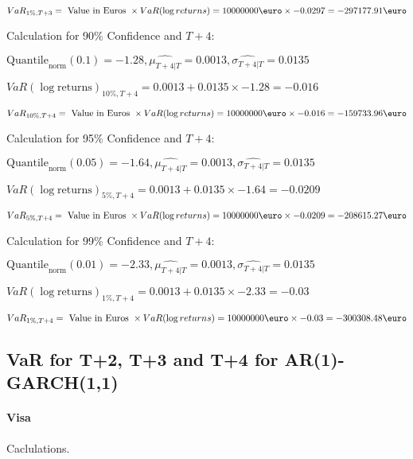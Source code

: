 \indent\indent $VaR_{1\%, T + 3} = \text{ Value in Euros } \times VaR(\log returns) = 10 000 000 \text{\euro} \times-0.0297 = -297177.91 \text{\euro}$\newline




Calculation for 90\% Confidence and $T+4$:

\indent\indent $\text{Quantile}_\text{norm}(0.1) = -1.28,\hat{\mu_{T+4|T}} = 0.0013, \hat{\sigma_{T+4|T}} = 0.0135$

\indent\indent $VaR(\log \text{returns})_{10\%, T + 4} = 0.0013 + 0.0135\times-1.28 = -0.016$

\indent\indent $VaR_{10\%, T + 4} = \text{ Value in Euros } \times VaR(\log returns) = 10 000 000 \text{\euro} \times-0.016 = -159733.96 \text{\euro}$\newline




Calculation for 95\% Confidence and $T+4$:

\indent\indent $\text{Quantile}_\text{norm}(0.05) = -1.64,\hat{\mu_{T+4|T}} = 0.0013, \hat{\sigma_{T+4|T}} = 0.0135$

\indent\indent $VaR(\log \text{returns})_{5\%, T + 4} = 0.0013 + 0.0135\times-1.64 = -0.0209$

\indent\indent $VaR_{5\%, T + 4} = \text{ Value in Euros } \times VaR(\log returns) = 10 000 000 \text{\euro} \times-0.0209 = -208615.27 \text{\euro}$\newline




Calculation for 99\% Confidence and $T+4$:

\indent\indent $\text{Quantile}_\text{norm}(0.01) = -2.33,\hat{\mu_{T+4|T}} = 0.0013, \hat{\sigma_{T+4|T}} = 0.0135$

\indent\indent $VaR(\log \text{returns})_{1\%, T + 4} = 0.0013 + 0.0135\times-2.33 = -0.03$

\indent\indent $VaR_{1\%, T + 4} = \text{ Value in Euros } \times VaR(\log returns) = 10 000 000 \text{\euro} \times-0.03 = -300308.48 \text{\euro}$\newline
\subsection{VaR for T+2, T+3 and T+4 for AR(1)-GARCH(1,1)}
\paragraph{Visa} Caclulations.\newline \indent 





